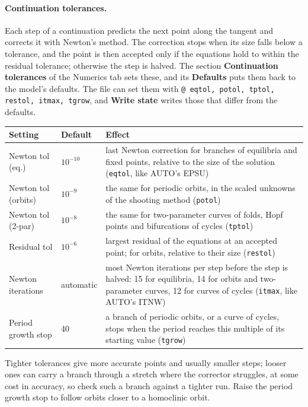 \documentclass[11pt,a4paper]{article}
\newcommand{\ui}[1]{\textsf{\textbf{#1}}}          %
\begin{document}
\paragraph{Continuation tolerances.} Each step of a continuation predicts the next point along the tangent and corrects it with Newton's method. The correction stops when its size falls below a tolerance, and the point is then accepted only if the equations hold to within the residual tolerance; otherwise the step is halved. The section \ui{Continuation tolerances} of the Numerics tab sets these, and its \ui{Defaults} puts them back to the model's defaults. The file can set them with \texttt{@ eqtol, potol, tptol, restol, itmax, tgrow}, and \ui{Write state} writes those that differ from the defaults.
\begin{center}\small
\begin{tabularx}{0.95\textwidth}{@{}llX@{}}
\toprule
Setting & Default & Effect\\
\midrule
Newton tol (eq.) & $10^{-10}$ & last Newton correction for branches of equilibria and fixed points, relative to the size of the solution (\texttt{eqtol}, like \textsf{AUTO}'s EPSU)\\
Newton tol (orbits) & $10^{-9}$ & the same for periodic orbits, in the scaled unknowns of the shooting method (\texttt{potol})\\
Newton tol (2-par) & $10^{-8}$ & the same for two-parameter curves of folds, Hopf points and bifurcations of cycles (\texttt{tptol})\\
Residual tol & $10^{-6}$ & largest residual of the equations at an accepted point; for orbits, relative to their size (\texttt{restol})\\
Newton iterations & automatic & most Newton iterations per step before the step is halved: 15 for equilibria, 14 for orbits and two-parameter curves, 12 for curves of cycles (\texttt{itmax}, like \textsf{AUTO}'s ITNW)\\
Period growth stop & 40 & a branch of periodic orbits, or a curve of cycles, stops when the period reaches this multiple of its starting value (\texttt{tgrow})\\
\bottomrule
\end{tabularx}
\end{center}
Tighter tolerances give more accurate points and usually smaller steps; looser ones can carry a branch through a stretch where the corrector struggles, at some cost in accuracy, so check such a branch against a tighter run. Raise the period growth stop to follow orbits closer to a homoclinic orbit.
\end{document}
